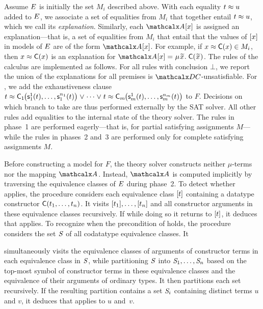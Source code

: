 Assume $E$ is initially the set $M_i$ described above. With each equality $t \approx u$ added
to $E$, we associate a set of equalities from $M_i$ that together entail $t
\approx u$, which we call its \emph{explanation}.
Similarly, each $\Val \ec{x}$ is assigned an explanation---that is, a set
of equalities from $M_i$ that entail that the values of $[x]$ in models of
$E$ are of the form $\Val \ec{x}$. For example, if $x \approx \textsf{C}( x ) \in
M_i$, then $x \approx \textsf{C}( x )$ is an %
explanation for $\Val \ec{x} = \MU {\Varec{x}}.\; \const{C}( {\Varec{x}} )$.
The rules of the calculus are implemented as follows. For all rules with
conclusion $\bot$, we report the union of the explanations for all premises is
$\thD$-unsatisfiable. For , we add the exhaustiveness clause %
$t \approx \textsf{C}_{1}\kern-0.083333em\bigl(\textsf{s}^1_{1}( t ), \ldots,\textsf{s}^{n_{1}}_{1}( t )\bigr) \mathrel\lor \cdots \mathrel\lor t \approx \textsf{C}_{m}\kern-0.083333em\bigl(\textsf{s}^1_{m}( t ), \ldots,\textsf{s}^{n_{m}}_{m}( t )\bigr)$ to $F$.
Decisions on which branch to take are thus performed externally by the SAT
solver. %
All other rules add equalities to the
internal state of the theory solver. The rules in phase~1 are performed
eagerly---that is, for partial satisfying assignments $M$---while the rules in
phases~2 and~3 are performed only for complete satisfying
assignments $M$.

Before constructing a model for $F\!$, the theory solver constructs neither $\mu$-terms nor the mapping $\Val$.
Instead, $\Val$ is computed implicitly by traversing the equivalence classes of $E$ during phase~2.
To detect whether  applies,
the procedure considers each equivalence class $[t]$ containing a datatype constructor $\textsf{C}( t_1, \ldots, t_n )$.
It visits $[t_1], \ldots, [t_n]$ and all constructor arguments in these equivalence classes recursively.
If while doing so it returns to $[t]$, it deduces that  applies. %
To recognize when the precondition of  holds,
the procedure considers the set $\mathit{S}$ of all codatatype equivalence classes.
It
%
\begin{conf}\goodbreak\noindent\end{conf}%
simultaneously visits the equivalence classes of arguments of constructor terms in each equivalence class in $\mathit{S}$,
while partitioning $\mathit{S}$ into $\mathit{S}_1, \ldots, \mathit{S}_n$ based on the top-most symbol of constructor terms in these equivalence classes
and the equivalence of their arguments of ordinary types.
It then partitions each set %
recursively.
If %
the resulting partition contains a set $\mathit{S}_i$ containing distinct terms $u$
and $v$, it deduces that  applies to $u$ and~$v$.

